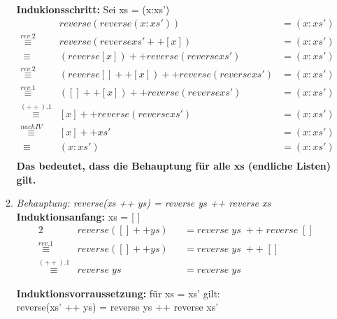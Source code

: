 \documentclass[11pt]{article}
\begin{document}
\begin{enumerate}
\begin{enumerate}
\vspace*{0.5cm}
\textbf{Indukionsschritt:} Sei xs = (x:xs')
\begin{align*}
&reverse(reverse (x:xs')) &= (x:xs')\\
\stackrel{rev.2}{\equiv} &reverse(reverse xs' ++ [x]) &= (x:xs')\\
\equiv\phantom{.} &(reverse [x]) ++ reverse(reverse xs') &= (x:xs')\\
\stackrel{rev.2}{\equiv} &(reverse [ ] ++ [x]) ++ reverse(reverse xs') &= (x:xs')\\
\stackrel{rev.1}{\equiv} &([ ] ++ [x]) ++ reverse(reverse xs') &= (x:xs')\\
\stackrel{(++).1}{\equiv} &[x] ++ reverse(reverse xs') &= (x:xs')\\
\stackrel{nach IV}{\equiv} &[x] ++ xs' &= (x:xs')\\
\equiv\phantom{.} &(x:xs') &= (x:xs')\\
\end{align*}
\vspace*{0.5cm}
\textbf{Das bedeutet, dass die Behauptung für alle xs (endliche Listen) gilt.}
\newpage
\vspace*{0.5cm}
\item
\textit{Behauptung: reverse(xs ++ ys) = reverse ys ++ reverse xs}\\
\vspace*{0.5cm}
\textbf{Induktionsanfang:} xs = [ ]
\begin{alignat*}{2}
&reverse([] ++ ys) &&= reverse\phantom{.}ys \phantom{.}++\phantom{.} reverse\phantom{.}[]\\
\stackrel{rev.1}{\equiv} &reverse([] ++ ys) &&= reverse\phantom{.} ys \phantom{.}++\phantom{.} []\\
\stackrel{(++).1}{\equiv} &reverse\phantom{.} ys &&= reverse\phantom{.} ys
\end{alignat*}

\vspace*{0.5cm}
\textbf{Induktionsvorraussetzung:} für xs = xs' gilt:\\
reverse(xs' ++ ys) = reverse ys ++ reverse xs'


\end{enumerate}
\end{enumerate}
\end{document}
